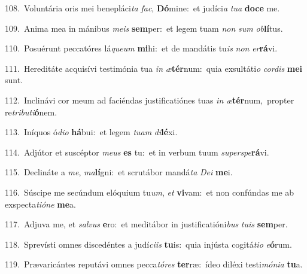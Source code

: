 {\numbfont\textcolor{\numbcolor}{108.}}~Voluntária oris mei benepláci\textit{ta} \textit{fac}\-, \textbf{Dó}\-mine:~\star et judíci\textit{a} \textit{tu}\-\textit{a} \textbf{do}\-\textbf{ce} me.\par
{\numbfont\textcolor{\numbcolor}{109.}}~Anima mea in mánibus \textit{me}\-\textit{is} \textbf{sem}\-per:~\star et legem tuam \textit{non} \textit{sum} \textit{ob}\-\textbf{lí}tus.\par
{\numbfont\textcolor{\numbcolor}{110.}}~Posuérunt peccatóres lá\-\textit{que}\-\textit{um} \textbf{mi}\-hi:~\star et de mandátis tu\textit{is} \textit{non} \textit{er}\-\textbf{rá}vi.\par
{\numbfont\textcolor{\numbcolor}{111.}}~Hereditáte acquisívi testimónia tua \textit{in} \textit{æ}\-\textbf{tér}num:~\star quia exsultáti\textit{o} \textit{cor}\-\textit{dis} \textbf{me}\-\textbf{i} sunt.\par
{\numbfont\textcolor{\numbcolor}{112.}}~Inclinávi cor meum ad faciéndas justificatiónes tuas \textit{in} \textit{æ}\-\textbf{tér}num,~\star propter re\-\textit{tri}\-\textit{bu}\textit{ti}\textbf{ó}nem.\par
{\numbfont\textcolor{\numbcolor}{113.}}~Iníquos ó\-\textit{di}\-\textit{o} \textbf{há}\-bui:~\star et legem \textit{tu}\-\textit{am} \textit{di}\-\textbf{lé}xi.\par
{\numbfont\textcolor{\numbcolor}{114.}}~Adjútor et suscéptor \textit{me}\-\textit{us} \textbf{es} tu:~\star et in verbum tuum \textit{su}\-\textit{per}\textit{spe}\textbf{rá}vi.\par
{\numbfont\textcolor{\numbcolor}{115.}}~Declináte a \textit{me}\-, \textit{ma}\-\textbf{lí}gni:~\star et scrutábor mandá\textit{ta} \textit{De}\-\textit{i} \textbf{me}\-i.\par
{\numbfont\textcolor{\numbcolor}{116.}}~Súscipe me secúndum elóquium tu\-\textit{um}\-, \textit{et} \textbf{vi}\-vam:~\star et non confúndas me ab exspecta\-\textit{ti}\-\textit{ó}\textit{ne} \textbf{me}\-a.\par
{\numbfont\textcolor{\numbcolor}{117.}}~Adjuva me, et \textit{sal}\-\textit{vus} \textbf{e}\-ro:~\star et meditábor in justificatióni\textit{bus} \textit{tu}\-\textit{is} \textbf{sem}\-per.\par
{\numbfont\textcolor{\numbcolor}{118.}}~Sprevísti omnes discedéntes a judí\-\textit{ci}\-\textit{is} \textbf{tu}\-is:~\star quia injústa cogitá\-\textit{ti}\-\textit{o} \textit{e}\-\textbf{ó}rum.\par
{\numbfont\textcolor{\numbcolor}{119.}}~Prævaricántes reputávi omnes pecca\-\textit{tó}\-\textit{res} \textbf{ter}\-ræ:~\star ídeo diléxi testi\-\textit{mó}\-\textit{ni}\textit{a} \textbf{tu}\-a.\par
